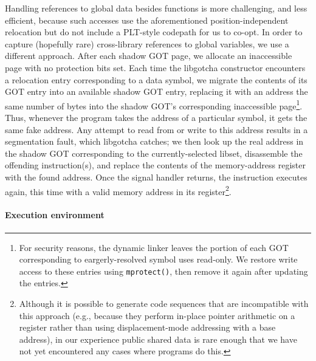 Handling references to global data besides functions is more challenging, and less
efficient, because such accesses use the aforementioned position-independent
relocation but do not include a PLT-style codepath for us to co-opt.
In order to capture (hopefully rare) cross-library references to global variables,
we use a different approach.  After each shadow GOT page, we allocate an inaccessible
page with no protection bits set.  Each time the libgotcha constructor encounters a
relocation entry corresponding to a data symbol, we migrate the contents of its GOT
entry into an available shadow GOT entry, replacing it with an address the same
number of bytes into the shadow GOT's corresponding inaccessible page\footnote{For
security reasons, the dynamic linker leaves the portion of each GOT corresponding to
eargerly-resolved symbol uses read-only.  We restore write access to these entries
using \texttt{mprotect()}, then remove it again after updating the entries.}.  Thus,
whenever the program takes the address of a particular symbol, it gets the same fake
address.  Any attempt to read from or write to this address results in a segmentation
fault, which libgotcha catches; we then look up the real address in the shadow GOT
corresponding to the currently-selected libset, disassemble the offending
instruction(s), and replace the contents of the memory-address register with the
found address.  Once the signal handler returns, the instruction executes again, this
time with a valid memory address in its register\footnote{Although it is possible to
generate code sequences that are incompatible with this approach (e.g., because they
perform in-place pointer arithmetic on a register rather than using displacement-mode
addressing with a base address), in our experience public shared data is rare enough
that we have not yet encountered any cases where programs do this.}.




\paragraph{Execution environment}

